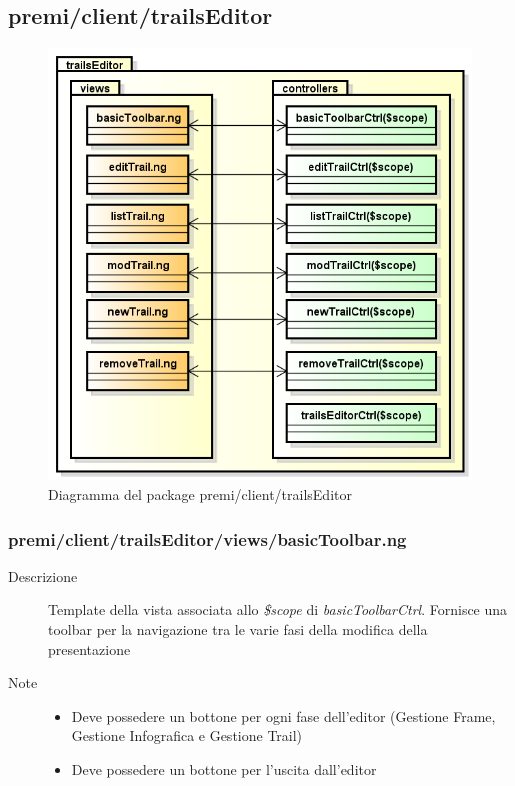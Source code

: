 \clearpage
\subsection{premi/client/trailsEditor}
\begin{figure}[h]
\begin{center}
\includegraphics[scale=0.55]{img/diapkg/trailsEditor.png}
\caption{Diagramma del package premi/client/trailsEditor}
\end{center}
\end{figure}

\subsubsection{premi/client/trailsEditor/views/basicToolbar.ng}

\begin{description}
\item[Descrizione] \hfill
	Template della vista associata allo \textit{\$scope} di \textit{basicToolbarCtrl}. Fornisce una toolbar per la navigazione tra le varie fasi della modifica della presentazione
\item[Note] \hfill
	\begin{itemize}
			\item Deve possedere un bottone per ogni fase dell'editor (Gestione Frame, Gestione Infografica e Gestione Trail)
			\item Deve possedere un bottone per l'uscita dall'editor
	\end{itemize}
\end{description}

